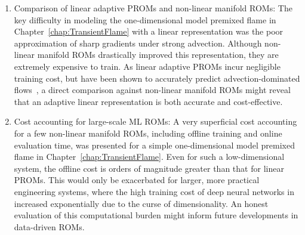 \begin{enumerate}
    \item Comparison of linear adaptive PROMs and non-linear manifold ROMs: The key difficulty in modeling the one-dimensional model premixed flame in Chapter~\ref{chap:TransientFlame} with a linear representation was the poor approximation of sharp gradients under strong advection. Although non-linear manifold ROMs drastically improved this representation, they are extremely expensive to train. As linear adaptive PROMs incur negligible training cost, but have been shown to accurately predict advection-dominated flows~\cite{WayneIsaacTanUy2022}, a direct comparison against non-linear manifold ROMs might reveal that an adaptive linear representation is both accurate and cost-effective.
    \item Cost accounting for large-scale ML ROMs: A very superficial cost accounting for a few non-linear manifold ROMs, including offline training and online evaluation time, was presented for a simple one-dimensional model premixed flame in Chapter~\ref{chap:TransientFlame}. Even for such a low-dimensional system, the offline cost is orders of magnitude greater than that for linear PROMs. This would only be exacerbated for larger, more practical engineering systems, where the high training cost of deep neural networks in increased exponentially due to the curse of dimensionality. An honest evaluation of this computational burden might inform future developments in data-driven ROMs.
\end{enumerate}